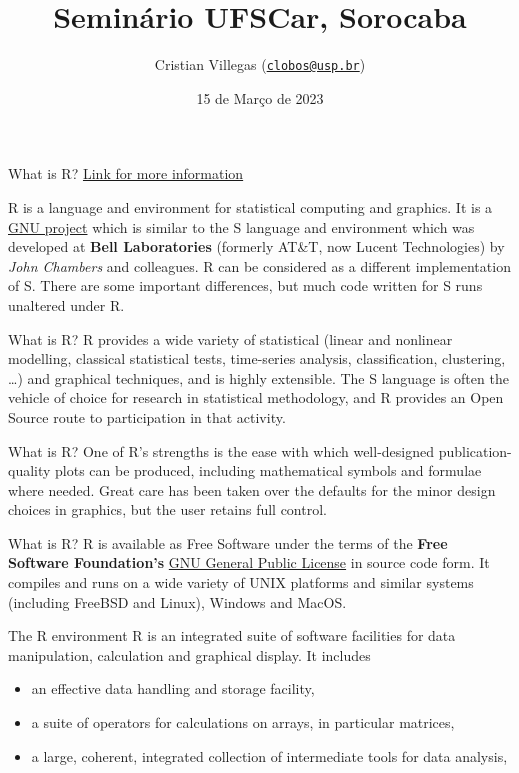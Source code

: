 \documentclass[
  ignorenonframetext,
]{beamer}
\title{Seminário UFSCar, Sorocaba}
\author{Cristian Villegas
(\href{mailto:clobos@usp.br}{\nolinkurl{clobos@usp.br}})}
\date{15 de Março de 2023}
\institute{Universidade de São Paulo}
\providecommand{\tightlist}{%
  \setlength{\itemsep}{0pt}\setlength{\parskip}{0pt}}
\begin{document}
\frame{\titlepage}

\begin{frame}{What is R?}
\protect\hypertarget{what-is-r}{}
\href{https://www.r-project.org/about.html}{Link for more information}

R is a language and environment for statistical computing and graphics.
It is a \href{https://www.gnu.org/}{GNU project} which is similar to the
S language and environment which was developed at \textbf{Bell
Laboratories} (formerly AT\&T, now Lucent Technologies) by \emph{John
Chambers} and colleagues. R can be considered as a different
implementation of S. There are some important differences, but much code
written for S runs unaltered under R.
\end{frame}

\begin{frame}{What is R?}
\protect\hypertarget{what-is-r-1}{}
R provides a wide variety of statistical (linear and nonlinear
modelling, classical statistical tests, time-series analysis,
classification, clustering, \ldots) and graphical techniques, and is
highly extensible. The S language is often the vehicle of choice for
research in statistical methodology, and R provides an Open Source route
to participation in that activity.
\end{frame}

\begin{frame}{What is R?}
\protect\hypertarget{what-is-r-2}{}
One of R's strengths is the ease with which well-designed
publication-quality plots can be produced, including mathematical
symbols and formulae where needed. Great care has been taken over the
defaults for the minor design choices in graphics, but the user retains
full control.
\end{frame}

\begin{frame}{What is R?}
\protect\hypertarget{what-is-r-3}{}
R is available as Free Software under the terms of the \textbf{Free
Software Foundation's} \href{https://www.r-project.org/COPYING}{GNU
General Public License} in source code form. It compiles and runs on a
wide variety of UNIX platforms and similar systems (including FreeBSD
and Linux), Windows and MacOS.
\end{frame}

\begin{frame}{The R environment}
\protect\hypertarget{the-r-environment}{}
R is an integrated suite of software facilities for data manipulation,
calculation and graphical display. It includes

\begin{itemize}[<+->]
\tightlist
\item
  an effective data handling and storage facility,
\item
  a suite of operators for calculations on arrays, in particular
  matrices,
\item
  a large, coherent, integrated collection of intermediate tools for
  data analysis,
\end{itemize}
\end{frame}
\end{document}
